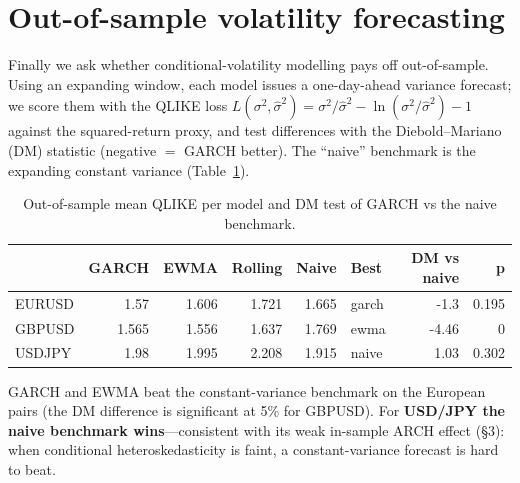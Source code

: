 \documentclass[11pt,a4paper]{article}
\begin{document}
\section{Out-of-sample volatility forecasting}
Finally we ask whether conditional-volatility modelling pays off out-of-sample. Using an expanding
window, each model issues a one-day-ahead variance forecast; we score them with the QLIKE loss
$L(\sigma^2,\hat\sigma^2)=\sigma^2/\hat\sigma^2-\ln(\sigma^2/\hat\sigma^2)-1$ against the squared-return
proxy, and test differences with the Diebold--Mariano (DM) statistic (negative $=$ GARCH better).
The ``naive'' benchmark is the expanding constant variance (Table~\ref{tab:hr}).
\begin{table}[H]\centering
\small
\caption{Out-of-sample mean QLIKE per model and DM test of GARCH vs the naive benchmark.}\label{tab:hr}
\begin{tabular}{lrrrrlrr}
\toprule
 & GARCH & EWMA & Rolling & Naive & Best & DM vs naive & p \\
\midrule
EURUSD & 1.57 & 1.606 & 1.721 & 1.665 & garch & -1.3 & 0.195 \\
GBPUSD & 1.565 & 1.556 & 1.637 & 1.769 & ewma & -4.46 & 0 \\
USDJPY & 1.98 & 1.995 & 2.208 & 1.915 & naive & 1.03 & 0.302 \\
\bottomrule
\end{tabular}
\end{table}
GARCH and EWMA beat the constant-variance benchmark on the European pairs (the DM difference is
significant at 5\% for GBPUSD). For \textbf{USD/JPY the naive benchmark wins}---consistent with its weak
in-sample ARCH effect (\S3): when conditional heteroskedasticity is faint, a constant-variance forecast
is hard to beat.
\end{document}
